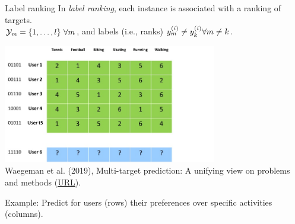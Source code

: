 \documentclass[11pt,compress,t,notes=noshow, xcolor=table]{beamer}
\begin{document}
\begin{frame}{Label ranking}
    In \emph{label ranking}, each instance is associated with a ranking of targets. \\
    $\mathcal{Y}_m = \{1, \ldots , l\} \ \forall m$, and labels (i.e., ranks) $y^{(i)}_m \neq y_{k}^{(i)} \forall m \neq k$. 

			

                
                
    			\begin{center}
                    \includegraphics[width=0.7\textwidth,trim = 0 0 100 0,clip]{figure/labelranking} \tiny
    				\\ Waegeman et al. (2019), Multi-target prediction:
    				A unifying view on problems and methods (\href{https://arxiv.org/pdf/1809.02352.pdf}{\underline{URL}}).
     	
    			\end{center}
  
	Example: Predict for users (rows) their preferences over specific activities (columns).
	
\end{frame}
\end{document}
